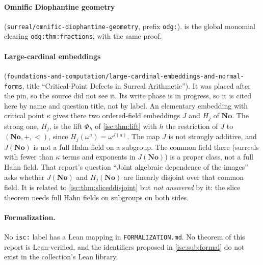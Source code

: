 \documentclass[11pt,letterpaper]{article}
\theoremstyle{definition}
\theoremstyle{remark}
\newcommand{\No}{\mathbf{No}}
\newcommand{\rpath}[1]{\nolinkurl{#1}}%
\newcommand{\lbl}[1]{\nolinkurl{#1}}%
\numberwithin{equation}{section}
\begin{document}
\paragraph{Omnific Diophantine geometry}
(\rpath{surreal/omnific-diophantine-geometry}, prefix \texttt{odg:}).
 is the global monomial clearing
\lbl{odg:thm:fractions}, with the same proof.

\paragraph{Large-cardinal embeddings}
(\rpath{foundations-and-computation/large-cardinal-embeddings-and-normal-forms},
title ``Critical-Point Defects in Surreal Arithmetic''). It was placed after
the pin, so the source did not see it. Its write phase is in progress, so
it is cited here by name and question title, not by label. An elementary
embedding with critical point $\kappa$ gives there two ordered-field
embeddings $J$ and $H_j$ of $\No$. The strong one, $H_j$, is the lift
$\Phi_h$ of \cref{isc:thm:lift} with $h$ the restriction of $J$ to
$(\No,+,<)$, since $H_j(\omega^a)=\omega^{J(a)}$. The map $J$ is not strongly
additive, and $J(\No)$ is not a full Hahn field on a subgroup. The common
field there (surreals with fewer than $\kappa$ terms and exponents in
$J(\No)$) is a proper class, not a full Hahn field. That report's question
``Joint algebraic dependence of the images'' asks whether $J(\No)$ and
$H_j(\No)$ are linearly disjoint over that common field. It is related to
\cref{isc:thm:sliceddisjoint} but \emph{not answered} by it: the slice
theorem needs full Hahn fields on subgroups on both sides.

\paragraph{Formalization.} No \texttt{isc:} label has a Lean mapping in
\rpath{FORMALIZATION.md}. No theorem of this report is Lean-verified, and
the identifiers proposed in \cref{isc:sub:formal} do not exist in the
collection's Lean library.
\end{document}
